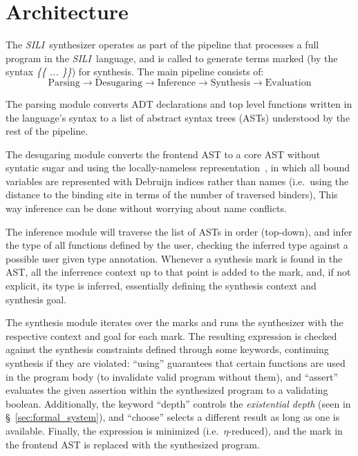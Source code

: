 \documentclass{llncs}
\newcommand{\synname}{\emph{SILI}}
\begin{document}
\section{Architecture}\label{sec:architecture}

The \synname\ synthesizer operates as part of the pipeline that processes a
full program in the \synname\ language, and is called to generate terms marked
(by the syntax \emph{\{\{ ... \}\}}) for
synthesis. The main pipeline consists of:
\[
    \textrm{Parsing} \rightarrow \textrm{Desugaring} \rightarrow
    \textrm{Inference} \rightarrow \textrm{Synthesis} \rightarrow
    \textrm{Evaluation}
\]

The parsing module converts ADT declarations and top level functions written in
the language's syntax to a list of abstract syntax trees (ASTs) understood by the rest of the
pipeline.

The desugaring module converts the frontend AST to a core AST without
syntatic sugar and using the locally-nameless
representation~\cite{DBLP:journals/jar/Chargueraud12}, in which all bound variables
are represented with Debruijn indices rather than names (i.e.~using
the distance to the binding site in terms of the number of traversed
binders),
This way inference can be done without worrying about name conflicts.

The inference module will traverse the list of ASTs in order (top-down), and
infer the type of all functions defined by the user, checking the inferred
type against a possible user given type annotation. Whenever a synthesis mark is
found in the AST, all the inferrence context up to that point is added to the
mark, and, if not explicit, its type is inferred, essentially defining the
synthesis context and synthesis goal.

The synthesis module iterates over the marks and runs the synthesizer
with the respective context and goal for each mark. The resulting expression is checked
against the synthesis constraints defined through some keywords, continuing
synthesis if they are violated: ``using'' guarantees that certain functions are
used in the program body (to invalidate valid program without them), and ``assert'' evaluates the given assertion within the
synthesized program to a validating boolean.  Additionally, the keyword
``depth'' controls the \emph{existential depth} (seen
in \S~\ref{sec:formal_system}), and ``choose'' selects a different result as long
as one is available. Finally, the expression is minimized (i.e.~$\eta$-reduced),
and the mark in the frontend AST is replaced with the synthesized program. 
\end{document}
